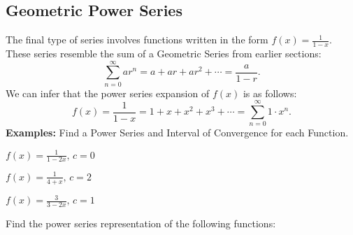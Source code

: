 \documentclass[addpoints, 12pt]{exam}
\begin{document}
\subsection*{Geometric Power Series}
The final type of series involves functions written in the form $\displaystyle f(x)=\frac{1}{1-x}$. These series resemble the sum of a Geometric Series from earlier sections: \[\displaystyle\sum_{n=0}^{\infty}ar^n=a+ar+ar^2+\cdots=\frac{a}{1-r}.\] We can infer that the power series expansion of $f(x)$ is as follows:
\[f(x)=\frac{1}{1-x}=1+x+x^2+x^3+\cdots=\sum_{n=0}^{\infty}1\cdot x^n.\]
\noindent\textbf{Examples:} Find a Power Series and Interval of Convergence for each Function.
\begin{questions}
    \begin{minipage}{0.45\linewidth}
        \question $\displaystyle f(x)=\frac{1}{1-2x},\, c=0$
    \end{minipage}
    \hfill
    \begin{minipage}{0.45\linewidth}
        \question $\displaystyle f(x)=\frac{1}{4+x},\,c=2$
    \end{minipage}

    
    
    \newpage

    \question $\displaystyle f(x)=\frac{3}{3-2x},\,c=1$
    
    \question Find the power series representation of the following functions:

\end{questions}
\end{document}
